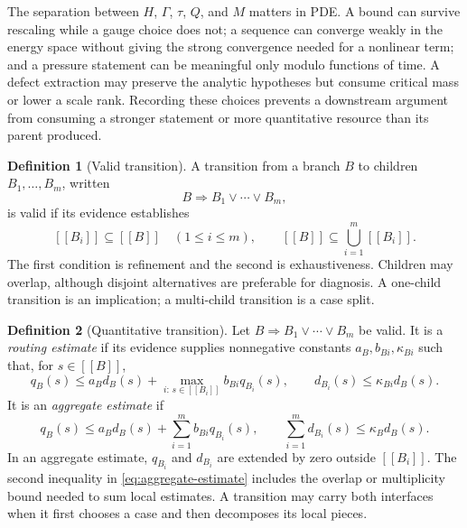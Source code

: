 \documentclass[11pt,reqno]{amsart}
\theoremstyle{plain}
\theoremstyle{definition}
\newtheorem{definition}[definition]{Definition}
\theoremstyle{remark}
\numberwithin{equation}{section}
\newcommand{\sem}[1]{[\![#1]\!]}
\begin{document}
The separation between \(H\), \(\Gamma\), \(\tau\), \(Q\), and \(M\) matters
in PDE.  A
bound can survive rescaling while a gauge choice does not; a sequence can
converge weakly in the energy space without giving the strong convergence
needed for a nonlinear term; and a pressure statement can be meaningful only
modulo functions of time.  A defect extraction may preserve the analytic
hypotheses but consume critical mass or lower a scale rank.  Recording these
choices prevents a downstream argument from consuming a stronger statement or
more quantitative resource than its parent produced.

\begin{definition}[Valid transition]\label{def:transition}
A transition from a branch \(B\) to children \(B_1,\ldots,B_m\), written
\[
  B\Longrightarrow B_1\vee\cdots\vee B_m,
\]
is valid if its evidence establishes
\begin{equation}\label{eq:transition-cover}
  \sem{B_i}\subseteq\sem B\quad(1\le i\le m),
  \qquad
  \sem B\subseteq\bigcup_{i=1}^m\sem{B_i}.
\end{equation}
The first condition is refinement and the second is exhaustiveness.  Children
may overlap, although disjoint alternatives are preferable for diagnosis.  A
one-child transition is an implication; a multi-child transition is a case
split.
\end{definition}

\begin{definition}[Quantitative transition]\label{def:quantitative-transition}
Let \(B\Longrightarrow B_1\vee\cdots\vee B_m\) be valid.  It is a
\emph{routing estimate} if its evidence supplies nonnegative constants
\(a_B,b_{Bi},\kappa_{Bi}\) such that, for \(s\in\sem B\),
\begin{equation}\label{eq:routing-estimate}
 q_B(s)
 \le a_Bd_B(s)
 +\max_{i:\,s\in\sem{B_i}} b_{Bi}q_{B_i}(s),
 \qquad
 d_{B_i}(s)\le\kappa_{Bi}d_B(s).
\end{equation}
It is an \emph{aggregate estimate} if
\begin{equation}\label{eq:aggregate-estimate}
 q_B(s)\le a_Bd_B(s)+\sum_{i=1}^m b_{Bi}q_{B_i}(s),
 \qquad
 \sum_{i=1}^m d_{B_i}(s)\le\kappa_Bd_B(s).
\end{equation}
In an aggregate estimate, \(q_{B_i}\) and \(d_{B_i}\) are extended by zero
outside \(\sem{B_i}\).
The second inequality in \eqref{eq:aggregate-estimate} includes the overlap or
multiplicity bound needed to sum local estimates.  A transition may carry both
interfaces when it first chooses a case and then decomposes its local pieces.
\end{definition}
\end{document}

